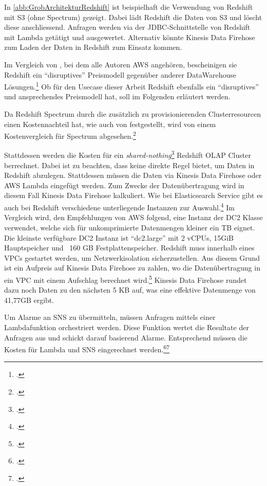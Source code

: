 In \autoref{abb:GrobArchitekturRedshift} ist beispielhaft die Verwendung von Redshift mit \ac{S3} (ohne Spectrum) gezeigt. Dabei lädt Redshift die Daten von \ac{S3} und löscht diese anschliessend. Anfragen werden via der \ac{JDBC}-Schnittstelle von Redshift mit Lambda getätigt und ausgewertet. Alternativ könnte Kinesis Data Firehose zum Laden der Daten in Redshift zum Einsatz kommen.


Im Vergleich von \citeauthor{Gupta.2015}, bei dem alle Autoren \ac{AWS} angehören, bescheinigen sie Redshift ein \enquote{disruptives} Preismodell gegenüber anderer DataWarehouse Lösungen.\footcite[Vgl.][]{Gupta.2015} Ob für den Usecase dieser Arbeit Redshift ebenfalls ein \enquote{disruptives} und ansprechendes Preismodell hat, soll im Folgenden erläutert werden.

Da Redshift Spectrum durch die zusätzlich zu provisionierenden Clusterresourcen einen Kostennachteil hat, wie auch von \citeauthor{Tan.2019} festgestellt, wird von einem Kostenvergleich für Spectrum abgesehen.\footcite[Vgl.][2178]{Tan.2019}

Stattdessen werden die Kosten für ein \textit{shared-nothing}\footcite[Vgl.][2172]{Tan.2019} Redshift \ac{OLAP} Cluster berrechnet. Dabei ist zu beachten, dass \AWSIOT{} keine direkte Regel bietet, um Daten in Redshift abzulegen. Stattdessen müssen die Daten via Kinesis Data Firehose oder \ac{AWS} Lambda eingefügt werden. Zum Zwecke der Datenübertragung wird in diesem Fall Kinesis Data Firehose kalkuliert. Wie bei Elasticsearch Service gibt es auch bei Redshift verschiedene unterliegende Instanzen zur Auswahl.\footcite[Vgl. auch im Folgenden][]{AmazonWebServicesInc..o.J.z} Im Vergleich wird, den Empfehlungen von \ac{AWS} folgend, eine Instanz der \ac{DC2} Klasse verwendet, welche sich für unkomprimierte Datenmengen kleiner ein TB eignet. Die kleinste verfügbare \ac{DC2} Instanz ist \enquote{dc2.large} mit 2 vCPUs, 15GiB Hauptspeicher und ~160 GB Festplattenspeicher. Redshift muss innerhalb eines \acp{VPC} gestartet werden, um Netzwerkisolation sicherzustellen. Aus diesem Grund ist ein Aufpreis auf Kinesis Data Firehose zu zahlen, wo die Datenübertragung in ein \ac{VPC} mit einem Aufschlag berechnet wird.\footcite[Vgl. auch im Folgenden][]{AmazonWebServicesInc..o.J.y} Kinesis Data Firehose rundet dazu noch Daten zu den nächsten 5 KB auf, was eine effektive Datenmenge von 41,77GB ergibt.

Um Alarme an \ac{SNS} zu übermitteln, müssen Anfragen mittels einer Lambdafunktion orchestriert werden. Diese Funktion wertet die Resultate der Anfragen aus und schickt darauf basierend Alarme. Entsprechend müssen die Kosten für Lambda und \ac{SNS} eingerechnet werden.\footcite[Vgl.][]{AmazonWebServicesInc..o.J.bx}\nzitat\footcite[Vgl.][]{AmazonWebServicesInc..o.J.by}

